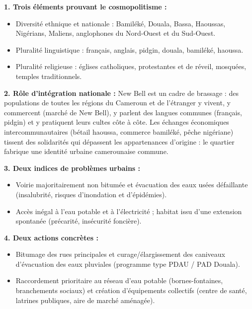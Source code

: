 \documentclass[11pt]{article}
\newcommand{\cle}[1]{{\popxbold\color{popdark}#1}}
\begin{document}
\begin{corrige}
\textbf{1. Trois éléments prouvant le cosmopolitisme :}
\begin{itemize}
    \item Diversité ethnique et nationale : Bamiléké, Douala, Bassa, Haoussas, Nigérians, Maliens, anglophones du Nord-Ouest et du Sud-Ouest.
    \item Pluralité linguistique : français, anglais, pidgin, douala, bamiléké, haoussa.
    \item Pluralité religieuse : églises catholiques, protestantes et de réveil, mosquées, temples traditionnels.
\end{itemize}

\textbf{2. Rôle d'intégration nationale :} New Bell est un cadre de \cle{brassage} : des populations de toutes les régions du Cameroun et de l'étranger y vivent, y commercent (marché de New Bell), y parlent des langues communes (français, pidgin) et y pratiquent leurs cultes côte à côte. Les échanges économiques intercommunautaires (bétail haoussa, commerce bamiléké, pêche nigériane) tissent des solidarités qui dépassent les appartenances d'origine : le quartier fabrique une identité urbaine camerounaise commune.

\textbf{3. Deux indices de problèmes urbains :}
\begin{itemize}
    \item Voirie majoritairement non bitumée et évacuation des eaux usées défaillante (insalubrité, risques d'inondation et d'épidémies).
    \item Accès inégal à l'eau potable et à l'électricité ; habitat issu d'une extension spontanée (précarité, insécurité foncière).
\end{itemize}

\textbf{4. Deux actions concrètes :}
\begin{itemize}
    \item Bitumage des rues principales et curage/élargissement des caniveaux d'évacuation des eaux pluviales (programme type PDAU / PAD Douala).
    \item Raccordement prioritaire au réseau d'eau potable (bornes-fontaines, branchements sociaux) et création d'équipements collectifs (centre de santé, latrines publiques, aire de marché aménagée).
\end{itemize}
\end{corrige}
\end{document}
